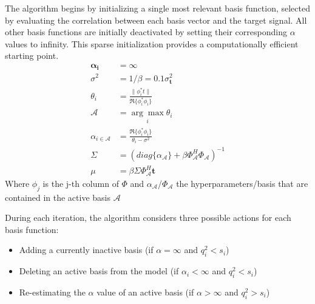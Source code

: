 \documentclass{article}
\begin{document}
The algorithm begins by initializing a single most relevant basis function, selected by evaluating the correlation between each basis vector and the target signal. All other basis functions are initially deactivated by setting their corresponding $\alpha$ values to infinity. This sparse initialization provides a computationally efficient starting point.
    \begin{equation}
    \begin{split}
    \boldsymbol{\alpha_i} &= \infty \\
    \sigma^2 &= 1/\beta = 0.1\sigma^2_{\boldsymbol{t}} \\
    \theta_i &= \frac{\|\phi_i^* t\|}{\Re\{\phi_i^*\phi_i\}} \\
    \mathcal{A} &= \underset{i}{\arg\max} \theta_i \\
    \alpha_{i\in\mathcal{A}} &= \frac{\Re\{\phi_i^*\phi_i\}}{\theta_i-\sigma^2} \\
    \Sigma &= (diag\{\alpha_\mathcal{A}\}+\beta\Phi_\mathcal{A}^H\Phi_\mathcal{A})^{-1} \\
    \mu &= \beta\Sigma\Phi_\mathcal{A}^H\boldsymbol{t}
    \end{split}
    \end{equation}
    Where $\phi_j$ is the j-th column of $\Phi$ and $\alpha_\mathcal{A}$/$\Phi_\mathcal{A}$ the hyperparameters/basis that are contained in the active basis $\mathcal{A}$

During each iteration, the algorithm considers three possible actions for each basis function:
\begin{itemize}
\item Adding a currently inactive basis (if $\alpha = \infty$ and $q_i^2<s_i$)
\item Deleting an active basis from the model (if $\alpha_i < \infty$ and $q_i^2 < s_i$)
\item Re-estimating the $\alpha$ value of an active basis (if $\alpha > \infty$ and $q_i^2>s_i$)
\end{itemize}
\end{document}
